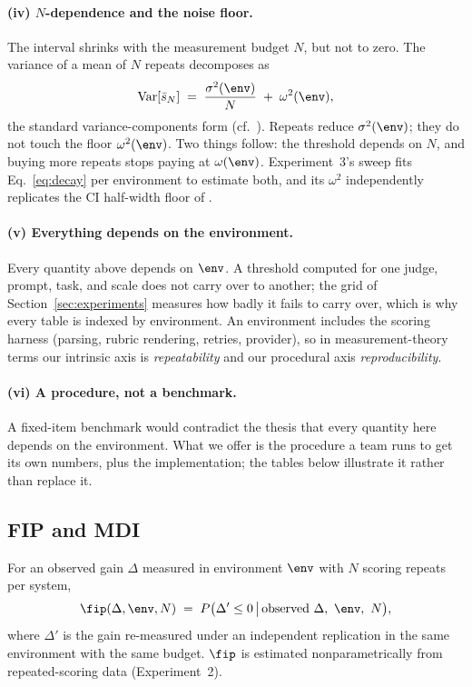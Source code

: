\paragraph{(iv) $N$-dependence and the noise floor.}
The interval shrinks with the measurement budget $N$, but not to zero. The
variance of a mean of $N$ repeats decomposes as
\begin{equation}
  \label{eq:decay}
  \operatorname{Var}\!\left[\bar{s}_N\right]
    \;=\; \frac{\sigma^2(\env)}{N} \;+\; \omega^2(\env),
\end{equation}
the standard variance-components form (cf.\
\citealp{miller2024errorbars, messing2026tee}). Repeats reduce
$\sigma^2(\env)$; they do not touch the floor $\omega^2(\env)$. Two things
follow: the threshold depends on $N$, and buying more repeats stops paying at
$\omega(\env)$. Experiment~3's sweep fits Eq.~\eqref{eq:decay} per environment
to estimate both, and its $\omega^2$ independently replicates the CI
half-width floor of \citet{messing2026tee}.

\paragraph{(v) Everything depends on the environment.}
Every quantity above depends on $\env$. A threshold computed for one judge,
prompt, task, and scale does not carry over to another; the grid of
Section~\ref{sec:experiments} measures how badly it fails to carry over, which
is why every table is indexed by environment.
An environment includes the scoring harness (parsing, rubric rendering,
retries, provider), so in measurement-theory terms our intrinsic axis is
\emph{repeatability} and our procedural axis \emph{reproducibility}.

\paragraph{(vi) A procedure, not a benchmark.}
A fixed-item benchmark would contradict the thesis that every quantity here
depends on the environment. What we offer is the procedure a team runs to get
its own numbers, plus the implementation; the tables below illustrate it rather
than replace it.

\subsection{FIP and MDI}
\label{sec:framework-defs}

\begin{definition}
  \label{def:fip}
  For an observed gain $\Delta$ measured in environment $\env$ with $N$
  scoring repeats per system,
  \begin{equation*}
    \fip(\Delta, \env, N)
      \;=\; P\bigl(\Delta' \le 0 \,\big|\, \text{observed } \Delta,\ \env,\ N\bigr),
  \end{equation*}
  where $\Delta'$ is the gain re-measured under an independent replication
  in the same environment with the same budget. $\fip$ is estimated
  nonparametrically from repeated-scoring data (Experiment~2).
\end{definition}

